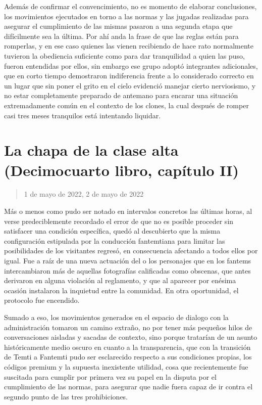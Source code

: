\documentclass[
]{book}
\begin{document}
Además de confirmar el convencimiento, no es momento de elaborar conclusiones, los movimientos ejecutados en torno a las normas y las jugadas realizadas para asegurar el cumplimiento de las mismas pasaron a una segunda etapa que difícilmente sea la última. Por ahí anda la frase de que las reglas están para romperlas, y en ese caso quienes las vienen recibiendo de hace rato normalmente tuvieron la obediencia suficiente como para dar tranquilidad a quien las puso, fueron entendidas por ellos, sin embargo ese grupo adoptó integrantes adicionales, que en corto tiempo demostraron indiferencia frente a lo considerado correcto en un lugar que sin poner el grito en el cielo evidenció manejar cierto nerviosismo, y no estar completamente preparado de antemano para encarar una situación extremadamente común en el contexto de los clones, la cual después de romper casi tres meses tranquilos está intentando liquidar.

\hypertarget{la-chapa-de-la-clase-alta-decimocuarto-libro-capuxedtulo-ii}{%
\section{La chapa de la clase alta (Decimocuarto libro, capítulo II)}\label{la-chapa-de-la-clase-alta-decimocuarto-libro-capuxedtulo-ii}}

\begin{quote}
1 de mayo de 2022, 2 de mayo de 2022
\end{quote}

Más o menos como pudo ser notado en intervalos concretos las últimas horas, al verse predeciblemente recordado el error de que no es posible proceder sin satisfacer una condición específica, quedó al descubierto que la misma configuración estipulada por la conducción fantemtiana para limitar las posibilidades de los visitantes regresó, en consecuencia afectando a todos ellos por igual. Fue a raíz de una nueva actuación del o los personajes que en los fantems intercambiaron más de aquellas fotografías calificadas como obscenas, que antes derivaron en alguna violación al reglamento, y que al aparecer por enésima ocasión instalaron la inquietud entre la comunidad. En otra oportunidad, el protocolo fue encendido.

Sumado a eso, los movimientos generados en el espacio de dialogo con la administración tomaron un camino extraño, no por tener más pequeños hilos de conversaciones aisladas y sacadas de contexto, sino porque tratarían de un asunto históricamente medio oscuro en cuanto a la transparencia, que con la transición de Temti a Fantemti pudo ser esclarecido respecto a sus condiciones propias, los códigos premium y la supuesta inexistente utilidad, cosa que recientemente fue suscitada para cumplir por primera vez su papel en la disputa por el cumplimiento de las normas, para asegurar que nadie fuera capaz de ir contra el segundo punto de las tres prohibiciones.
\end{document}
